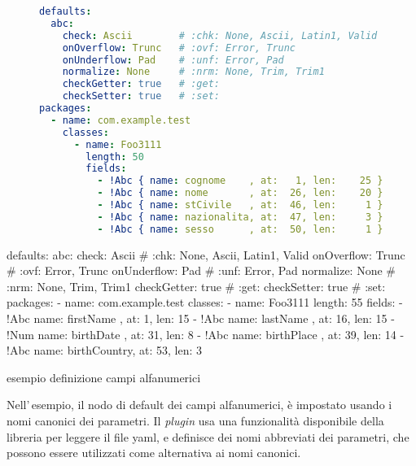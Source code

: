 \ifesource
\begin{figure*}[!htb]
\begin{lstlisting}[language=yaml, caption={esempio definizione campi alfanumerici}, 
label=lst:xmplAbc]
defaults:
  abc:
    check: Ascii        # :chk: None, Ascii, Latin1, Valid
    onOverflow: Trunc   # :ovf: Error, Trunc
    onUnderflow: Pad    # :unf: Error, Pad
    normalize: None     # :nrm: None, Trim, Trim1
    checkGetter: true   # :get:
    checkSetter: true   # :set:
packages:
  - name: com.example.test
    classes:
      - name: Foo3111
        length: 50
        fields:
          - !Abc { name: cognome    , at:   1, len:    25 }
          - !Abc { name: nome       , at:  26, len:    20 }
          - !Abc { name: stCivile   , at:  46, len:     1 }
          - !Abc { name: nazionalita, at:  47, len:     3 }
          - !Abc { name: sesso      , at:  50, len:     1 }
\end{lstlisting}
\end{figure*}
\else
\begin{elisting}[!htb]
\begin{yamlcode}
defaults:
  abc:
    check: Ascii        # :chk: None, Ascii, Latin1, Valid
    onOverflow: Trunc   # :ovf: Error, Trunc
    onUnderflow: Pad    # :unf: Error, Pad
    normalize: None     # :nrm: None, Trim, Trim1
    checkGetter: true   # :get:
    checkSetter: true   # :set:
packages:
  - name: com.example.test
    classes:
      - name: Foo3111
        length: 55
        fields:
          - !Abc { name: firstName   , at:  1, len: 15 }
          - !Abc { name: lastName    , at: 16, len: 15 }
          - !Num { name: birthDate   , at: 31, len:  8 }
          - !Abc { name: birthPlace  , at: 39, len: 14 }
          - !Abc { name: birthCountry, at: 53, len:  3 }
\end{yamlcode}
\caption{esempio definizione campi alfanumerici}
\label{lst:xmplAbc}
\end{elisting}
\fi

Nell'\,esempio, il nodo di default dei campi alfanumerici, è impostato usando
i nomi canonici dei parametri. Il \textit{plugin} usa una funzionalità 
disponibile della libreria per leggere il file yaml, e definisce dei nomi
abbreviati dei parametri, che possono essere utilizzati come alternativa ai
nomi canonici.

